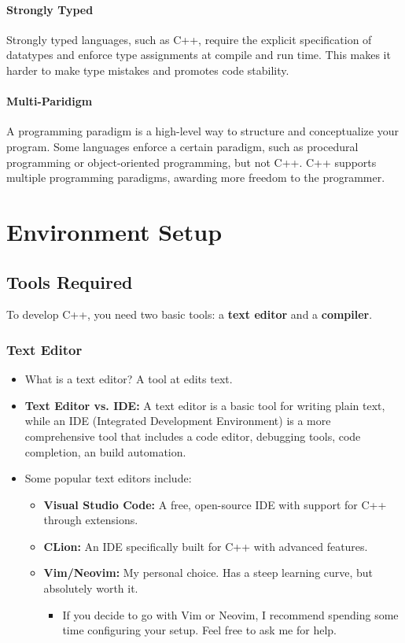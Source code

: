 \documentclass{article}
\begin{document}
\paragraph{Strongly Typed}
Strongly typed languages, such as C++, require the explicit specification of datatypes and enforce type assignments at compile and run time. This makes it harder to make type mistakes and promotes code stability.

\paragraph{Multi-Paridigm}
A programming paradigm is a high-level way to structure and conceptualize your program. Some languages enforce a certain paradigm, such as procedural programming or object-oriented programming, but not C++. C++ supports multiple programming paradigms, awarding more freedom to the programmer.

\section{Environment Setup}

\subsection{Tools Required}

\noindent
To develop C++, you need two basic tools: a \textbf{text editor} and a \textbf{compiler}.

\subsubsection{Text Editor}

\begin{itemize}
	\item What is a text editor? A tool at edits text. 
	\item \textbf{Text Editor vs. IDE:} A text editor is a basic tool for writing plain text, while an IDE (Integrated Development Environment) is a more comprehensive tool that includes a code editor, debugging tools, code completion, an build automation.
	\item Some popular text editors include:
	\begin{itemize}
		\item \textbf{Visual Studio Code:} A free, open-source IDE with support for C++ through extensions.
		\item \textbf{CLion:} An IDE specifically built for C++ with advanced features.
		\item \textbf{Vim/Neovim:} My personal choice. Has a steep learning curve, but absolutely worth it.
		\begin{itemize}
			\item If you decide to go with Vim or Neovim, I recommend spending some time configuring your setup. Feel free to ask me for help.
		\end{itemize}
	\end{itemize}
\end{itemize}
\end{document}
